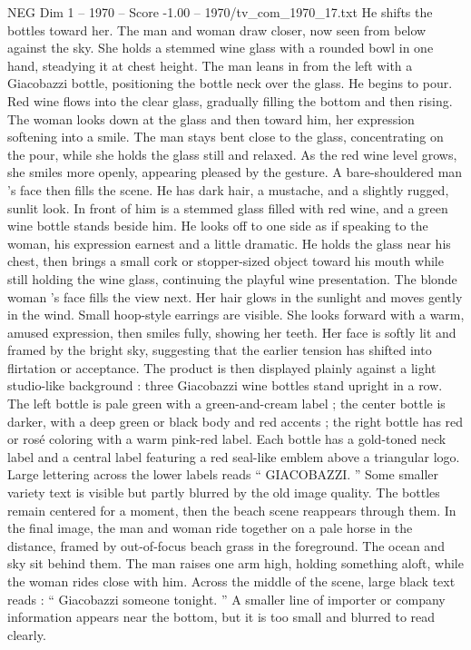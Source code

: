 \begin{textsample}{NEG Dim 1 – 1970 – Score -1.00 – 1970/tv\_com\_1970\_17.txt}
He shifts the bottles toward her.
The man and woman draw closer, now seen from below against the sky.
She holds a stemmed wine glass with a rounded bowl in one hand, steadying it at chest height.
The man leans in from the left with a Giacobazzi bottle, positioning the bottle neck over the glass.
He begins to pour.
Red wine flows into the clear glass, gradually filling the bottom and then rising.
The woman looks down at the glass and then toward him, her expression softening into a smile.
The man stays bent close to the glass, concentrating on the pour, while she holds the glass still and relaxed.
As the red wine level grows, she smiles more openly, appearing pleased by the gesture.
A bare-shouldered man ’s face then fills the scene.
He has dark hair, a mustache, and a slightly rugged, sunlit look.
In front of him is a stemmed glass filled with red wine, and a green wine bottle stands beside him.
He looks off to one side as if speaking to the woman, his expression earnest and a little dramatic.
He holds the glass near his chest, then brings a small cork or stopper-sized object toward his mouth while still holding the wine glass, continuing the playful wine presentation.
The blonde woman ’s face fills the view next.
Her hair glows in the sunlight and moves gently in the wind.
Small hoop-style earrings are visible.
She looks forward with a warm, amused expression, then smiles fully, showing her teeth.
Her face is softly lit and framed by the bright sky, suggesting that the earlier tension has shifted into flirtation or acceptance.
The product is then displayed plainly against a light studio-like background : three Giacobazzi wine bottles stand upright in a row.
The left bottle is pale green with a green-and-cream label ; the center bottle is darker, with a deep green or black body and red accents ; the right bottle has red or rosé coloring with a warm pink-red label.
Each bottle has a gold-toned neck label and a central label featuring a red seal-like emblem above a triangular logo.
Large lettering across the lower labels reads “ GIACOBAZZI. ” Some smaller variety text is visible but partly blurred by the old image quality.
The bottles remain centered for a moment, then the beach scene reappears through them.
In the final image, the man and woman ride together on a pale horse in the distance, framed by out-of-focus beach grass in the foreground.
The ocean and sky sit behind them.
The man raises one arm high, holding something aloft, while the woman rides close with him.
Across the middle of the scene, large black text reads : “ Giacobazzi someone tonight. ” A smaller line of importer or company information appears near the bottom, but it is too small and blurred to read clearly.

\end{textsample}

